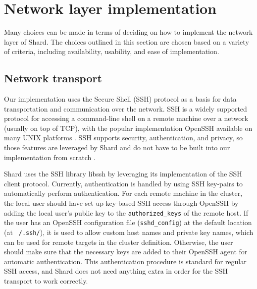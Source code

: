 \documentclass[twoside]{report}
\begin{document}
\section{Network layer implementation}


Many choices can be made in terms of deciding on how to implement the network layer of Shard.
The choices outlined in this section are chosen based on a variety of criteria, including availability, usability, and ease of implementation.

\subsection{Network transport}
Our implementation uses the Secure Shell (SSH) protocol as a basis for data transportation and communication over the network.
SSH is a widely supported protocol for accessing a command-line shell on a remote machine over a network (usually on top of TCP), with the popular implementation OpenSSH available on many UNIX platforms \cite{openssh}.
SSH supports security, authentication, and privacy, so those features are leveraged by Shard and do not have to be built into our implementation from scratch \cite{rfc4251}.

Shard uses the SSH library libssh by leveraging its implementation of the SSH client protocol.
Currently, authentication is handled by using SSH key-pairs to automatically perform authentication.
For each remote machine in the cluster, the local user should have set up key-based SSH access through OpenSSH by adding the local user's public key to the \texttt{authorized\_keys} of the remote host.
If the user has an OpenSSH configuration file (\texttt{sshd\_config}) at the default location (at \texttt{~/.ssh/}), it is used to allow custom host names and private key names, which can be used for remote targets in the cluster definition.
Otherwise, the user should make sure that the necessary keys are added to their OpenSSH agent for automatic authentication.
This authentication procedure is standard for regular SSH access, and Shard does not need anything extra in order for the SSH transport to work correctly.
\end{document}
